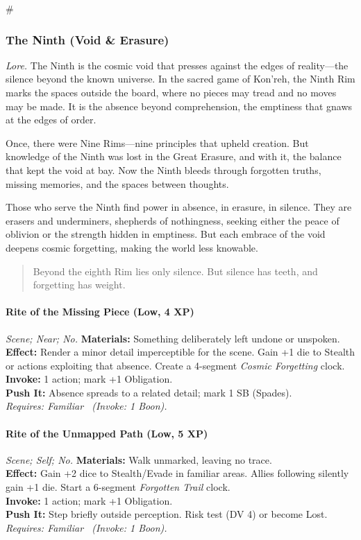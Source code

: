 # %

\subsubsection{The Ninth (Void \& Erasure)}
\textit{Lore.} The Ninth is the cosmic void that presses against the edges of reality—the silence beyond the known universe. In the sacred game of Kon'reh, the Ninth Rim marks the spaces outside the board, where no pieces may tread and no moves may be made. It is the absence beyond comprehension, the emptiness that gnaws at the edges of order.

Once, there were Nine Rims—nine principles that upheld creation. But knowledge of the Ninth was lost in the Great Erasure, and with it, the balance that kept the void at bay. Now the Ninth bleeds through forgotten truths, missing memories, and the spaces between thoughts.

Those who serve the Ninth find power in absence, in erasure, in silence. They are erasers and underminers, shepherds of nothingness, seeking either the peace of oblivion or the strength hidden in emptiness. But each embrace of the void deepens cosmic forgetting, making the world less knowable.

\begin{quote}
Beyond the eighth Rim lies only silence. But silence has teeth, and forgetting has weight.
\end{quote}

\paragraph*{Rite of the Missing Piece (Low, 4 XP)} \emph{Scene; Near; No.}
\textbf{Materials:} Something deliberately left undone or unspoken.\\
\textbf{Effect:} Render a minor detail imperceptible for the scene. Gain +1 die to Stealth or actions exploiting that absence. Create a 4-segment \emph{Cosmic Forgetting} clock.\\
\textbf{Invoke:} 1 action; mark +1 Obligation.\\
\textbf{Push It:} Absence spreads to a related detail; mark 1 SB (Spades).\\
\emph{Requires: Familiar \ (\textit{Invoke:} 1 Boon).}

\paragraph*{Rite of the Unmapped Path (Low, 5 XP)} \emph{Scene; Self; No.}
\textbf{Materials:} Walk unmarked, leaving no trace.\\
\textbf{Effect:} Gain +2 dice to Stealth/Evade in familiar areas. Allies following silently gain +1 die. Start a 6-segment \emph{Forgotten Trail} clock.\\
\textbf{Invoke:} 1 action; mark +1 Obligation.\\
\textbf{Push It:} Step briefly outside perception. Risk test (DV 4) or become Lost.\\
\emph{Requires: Familiar \ (\textit{Invoke:} 1 Boon).}

